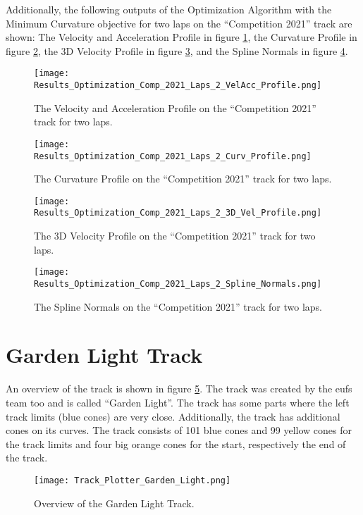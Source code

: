 Additionally, the following outputs of the Optimization Algorithm with the Minimum Curvature objective for two laps on the ``Competition 2021'' track are shown: The Velocity and Acceleration Profile in figure \ref{fig:Results Comp 2021 Laps 2 VelAcc Profile}, the Curvature Profile in figure \ref{fig:Results Comp 2021 Laps 2 Curv Profile}, the 3D Velocity Profile in figure \ref{fig:Results Comp 2021 Laps 2 3D Vel Profile}, and the Spline Normals in figure \ref{fig:Results Comp 2021 Laps 2 Spline Normals}.
\begin{figure}[H]
    \centering
    \texttt{[image: Results\_Optimization\_Comp\_2021\_Laps\_2\_VelAcc\_Profile.png]}
    \caption{The Velocity and Acceleration Profile on the ``Competition 2021'' track for two laps.}
    \label{fig:Results Comp 2021 Laps 2 VelAcc Profile}
\end{figure}
\begin{figure}[H]
    \centering
    \texttt{[image: Results\_Optimization\_Comp\_2021\_Laps\_2\_Curv\_Profile.png]}
    \caption{The Curvature Profile on the ``Competition 2021'' track for two laps.}
    \label{fig:Results Comp 2021 Laps 2 Curv Profile}
\end{figure}
\begin{figure}[H]
    \centering
    \texttt{[image: Results\_Optimization\_Comp\_2021\_Laps\_2\_3D\_Vel\_Profile.png]}
    \caption{The 3D Velocity Profile on the ``Competition 2021'' track for two laps.}
    \label{fig:Results Comp 2021 Laps 2 3D Vel Profile}
\end{figure}
\begin{figure}[H]
    \centering
    \texttt{[image: Results\_Optimization\_Comp\_2021\_Laps\_2\_Spline\_Normals.png]}
    \caption{The Spline Normals on the ``Competition 2021'' track for two laps.}
    \label{fig:Results Comp 2021 Laps 2 Spline Normals}
\end{figure}

\pagebreak

\section{Garden Light Track} \label{sec:Results Garden Light Track}
An overview of the track is shown in figure \ref{fig:Results Garden Light Initial}. The track was created by the \acrshort{eufs} team too and is called ``Garden Light''. \cite{eufs_sim_gitlab} The track has some parts where the left track limits (blue cones) are very close. Additionally, the track has additional cones on its curves. The track consists of 101 blue cones and 99 yellow cones for the track limits and four big orange cones for the start, respectively the end of the track.
\begin{figure}[H]
    \centering
    \texttt{[image: Track\_Plotter\_Garden\_Light.png]}
    \caption{Overview of the Garden Light Track.}
    \label{fig:Results Garden Light Initial}
\end{figure}

